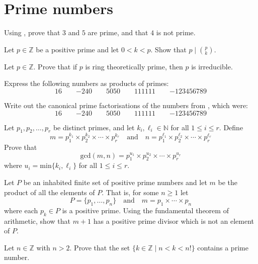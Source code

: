 \section{Prime numbers}


\begin{exercise}
Using , prove that $3$ and $5$ are prime, and that $4$ is not prime.
\end{exercise}



\begin{exercise}
Let $p \in \mathbb{Z}$ be a positive prime and let $0 < k < p$. Show that $p \mid \binom{p}{k}$.
\end{exercise}


\begin{exercise}
Let $p \in \mathbb{Z}$. Prove that if $p$ is ring theoretically prime, then $p$ is irreducible.
\end{exercise}


\begin{exercise}
\label{exNumbersAsProductsOfPrimes}
Express the following numbers as products of primes:
\[ 16 \qquad {-240} \qquad 5050 \qquad 111111 \qquad {-123456789} \]
\end{exercise}


\begin{exercise}
Write out the canonical prime factorisations of the numbers from , which were:
\[ 16 \qquad {-240} \qquad 5050 \qquad 111111 \qquad {-123456789} \]
\end{exercise}


\begin{exercise}
\label{exGCDfromFTA}
Let $p_1,p_2,\dots,p_r$ be distinct primes, and let $k_i,\ell_i \in \mathbb{N}$ for all $1 \le i \le r$. Define
\[ m = p_1^{k_1} \times p_2^{k_2} \times \cdots \times p_r^{k_r} \quad \text{and} \quad n = p_1^{\ell_1} \times p_2^{\ell_2} \times \cdots \times p_r^{\ell_r} \]
Prove that
\[ \mathrm{gcd}(m,n) = p_1^{u_1} \times p_2^{u_2} \times \cdots \times p_r^{u_r} \]
where $u_i = \mathrm{min} \{ k_i, \ell_i \}$ for all $1 \le i \le r$.
\end{exercise}

\begin{exercise}
\label{exConstructPrimeNotInList}
Let $P$ be an inhabited finite set of positive prime numbers and let $m$ be the product of all the elements of $P$. That is, for some $n \ge 1$ let
\[ P = \{ p_1, \dots, p_n \} \quad \text{and} \quad m = p_1 \times \cdots \times p_n \]
where each $p_k \in P$ is a positive prime. Using the fundamental theorem of arithmetic, show that $m+1$ has a positive prime divisor which is not an element of $P$.
\end{exercise}

\begin{exercise}
\label{exPrimesUsingFactorials}
Let $n \in \mathbb{Z}$ with $n>2$. Prove that the set $\{ k \in \mathbb{Z} \mid n<k<n! \}$ contains a prime number.
\end{exercise}